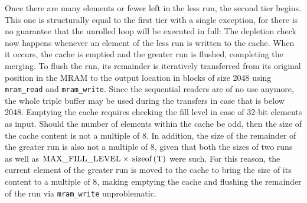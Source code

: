 Once there are \unrollfactor{} many elements or fewer left in the less run, the second tier begins.
This one is structurally equal to the first tier with a single exception, for there is no guarantee that the unrolled loop will be executed in full:
The depletion check now happens whenever an element of the less run is written to the cache.
When it occurs, the cache is emptied and the greater run is flushed, completing the merging.
To flush the run, its remainder is iteratively transferred from its original position in the MRAM to the output location in blocks of size \qty{2048}{\byte} using \lstinline|mram_read| and \lstinline|mram_write|.
Since the sequential readers are of no use anymore, the whole triple buffer may be used during the transfers in case that \cachesize{} is below 2048.
Emptying the cache requires checking the fill level in case of 32-bit elements as input.
Should the number of elements within the cache be odd, then the size of the cache content is not a multiple of 8.
In addition, the size of the remainder of the greater run is also not a multiple of 8, given that both the sizes of two runs as well as \(\unrolledcachelength{} \times \text{\lstinline[keywords={}]|sizeof(T)|}\) were such.
For this reason, the current element of the greater run is moved to the cache to bring the size of its content to a multiple of 8, making emptying the cache and flushing the remainder of the run via \lstinline|mram_write| unproblematic.

\SetArgSty{}
\SetFuncArgSty{}





